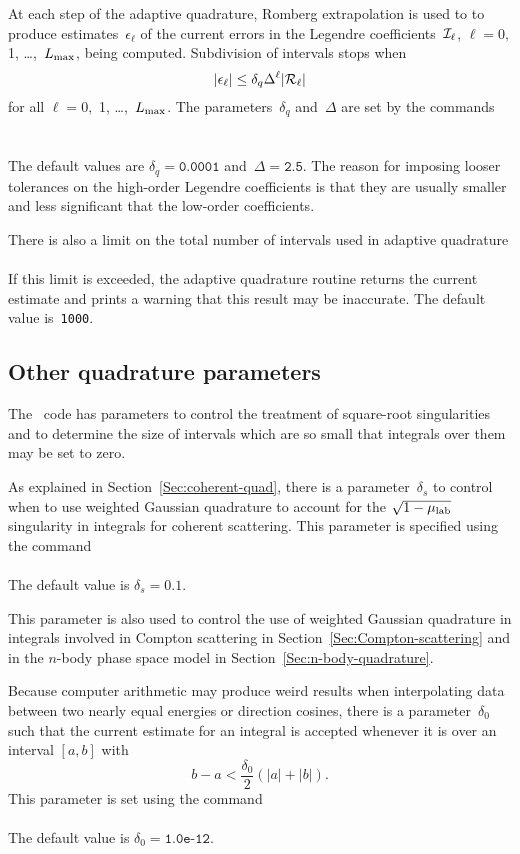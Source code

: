 At each step of the adaptive quadrature, Romberg extrapolation is used to 
to produce estimates~$\epsilon_\ell$ of the current errors in
the Legendre coefficients~${\cal I}_\ell$, $\ell = 0,$ 1, \ldots,~$L_{\text{max}}$,
being computed.  Subdivision of intervals stops when
$$
  | \epsilon_\ell | \le \delta_q \Delta^\ell | {\cal R}_\ell |
$$
for all $\ell = 0,$ 1, \ldots,~$L_{\text{max}}$.  The parameters~$\delta_q$
and~$ \Delta$ are set by the commands\\
  \\
  \\
The default values are $\delta_q = \texttt{0.0001}$
and~$\Delta = \texttt{2.5}$.  The reason for imposing looser tolerances
on the high-order Legendre coefficients is that they are usually
smaller and less significant that the low-order coefficients.

There is also a limit on the total number of intervals used in
adaptive quadrature\\
  \\
If this limit is exceeded, the adaptive quadrature routine returns
the current estimate and prints a warning that this result may be
inaccurate.  The default value is~\texttt{1000}.

\subsection{Other quadrature parameters}\label{Sec:sqrt-quad}
The \gettransfer\ code has parameters to control the treatment of
square-root singularities and to determine the size of
intervals which are so small that integrals over them may be set to zero.

As explained in Section~\ref{Sec:coherent-quad},
there is a parameter~$\delta_s$ to control when to use weighted Gaussian
quadrature to account for the $\sqrt{ 1 - \mu_{\text{lab}} }$ singularity in
integrals for coherent scattering.  This
parameter is specified using the command\\
  \\
The default value is $\delta_s = 0.1$.  

This parameter is also used to control the use of weighted
Gaussian quadrature in integrals involved in Compton scattering
in Section~\ref{Sec:Compton-scattering} and in the $n$-body phase space model
in Section~\ref{Sec:n-body-quadrature}.

Because computer arithmetic may produce weird results when
interpolating data between two nearly equal energies or
direction cosines, there is a parameter~$\delta_0$ such that
the current estimate for an integral is accepted
whenever it is over an interval $[a, b]$ with
$$
  b - a < \frac{\delta_0}{2} \left(
    |a| + |b| 
  \right).
$$
This parameter is set using the command\\
  \\
The default value is $\delta_0 = \texttt{1.0e-12}$.

